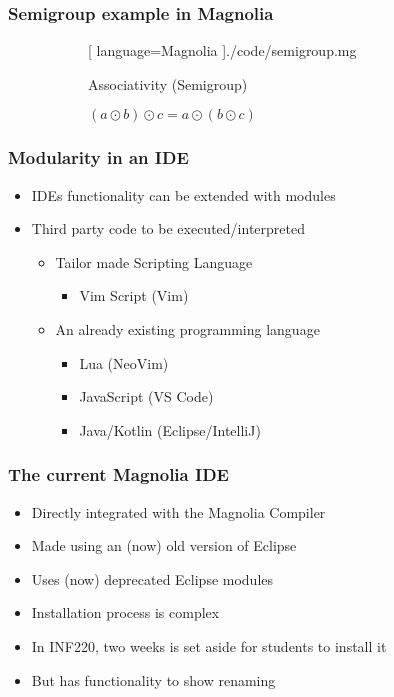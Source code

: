 \begin{frame}
  \frametitle{Semigroup example in Magnolia}
  \begin{figure}[H]
    \begin{subfigure}[h]{0.45\textwidth}
  \begin{center}
    
    [ language=Magnolia
    ]{./code/semigroup.mg}
  \end{center}
    \end{subfigure}
    \hfill
    \begin{subfigure}[h]{0.45\textwidth}
      Associativity (Semigroup)
      \begin{center}
        $(a \odot b) \odot c = a \odot (b \odot c)$
      \end{center}
    \end{subfigure}
  \end{figure}
\end{frame}

\begin{frame}
  \frametitle{Modularity in an IDE}
  \begin{itemize}
    \item IDEs functionality can be extended with modules
    \item Third party code to be executed/interpreted
      \begin{itemize}
        \item Tailor made Scripting Language
          \begin{itemize}
            \item Vim Script (Vim)
          \end{itemize}
        \item An already existing programming language
          \begin{itemize}
            \item Lua (NeoVim)
            \item JavaScript (VS Code)
            \item Java/Kotlin (Eclipse/IntelliJ)
          \end{itemize}
      \end{itemize}
  \end{itemize}
\end{frame}

\begin{frame}
  \frametitle{The current Magnolia IDE}
  \begin{itemize}
    \item Directly integrated with the Magnolia Compiler
    \item Made using an (now) old version of Eclipse
    \item Uses (now) deprecated Eclipse modules
    \item Installation process is complex
    \item In INF220, two weeks is set aside for students to install it
    \item But has functionality to show renaming
  \end{itemize}
\end{frame}
